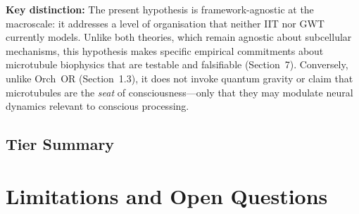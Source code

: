 \documentclass[10pt, a4paper, twocolumn]{article}
\begin{document}
\textbf{Key distinction:} The present hypothesis is
framework-agnostic at the macroscale: it addresses a level of
organisation that neither IIT nor GWT currently models. Unlike
both theories, which remain agnostic about subcellular
mechanisms, this hypothesis makes specific empirical commitments
about microtubule biophysics that are testable and falsifiable
(Section~7). Conversely, unlike Orch~OR (Section~1.3), it does
not invoke quantum gravity or claim that microtubules are the
\emph{seat} of consciousness---only that they may modulate
neural dynamics relevant to conscious processing.

\subsection{Tier Summary}

\begin{table}[!ht]
\centering
\caption{Summary of the three-tier evidential framework.}
\label{tab:tiers}
\end{table}

\section{Limitations and Open Questions}
\end{document}
